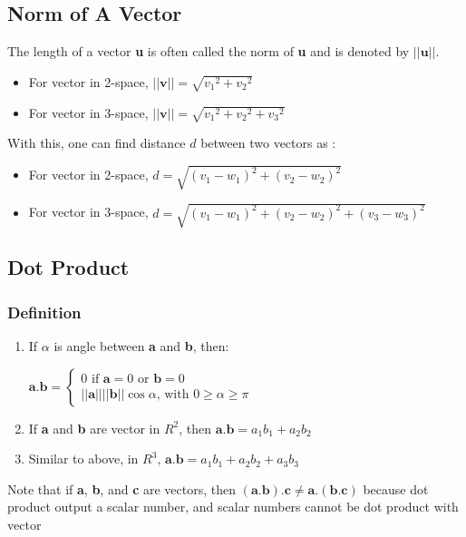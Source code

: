 \documentclass[a4paper,12pt]{article}
\begin{document}
\subsection*{Norm of A Vector}
The length of a vector \textbf{u} is often called the norm of \textbf{u} and is denoted by \(||\textbf{u}||\).
\begin{itemize}
  \item For vector in 2-space, \(||\textbf{v}||=\sqrt{{v_1}^2+{v_2}^2}\)
  \item For vector in 3-space, \(||\textbf{v}||=\sqrt{{v_1}^2+{v_2}^2+{v_3}^2}\)
\end{itemize}
With this, one can find distance \(d\) between two vectors as :
\begin{itemize}
  \item For vector in 2-space, \(d=\sqrt{(v_1-w_1)^2+(v_2-w_2)^2}\)
  \item For vector in 3-space, \(d=\sqrt{(v_1-w_1)^2+(v_2-w_2)^2+(v_3-w_3)^2}\)
\end{itemize}

\subsection*{Dot Product}
\subsubsection*{Definition}
\begin{enumerate}
  \item If \(\alpha\) is angle between \textbf{a} and \textbf{b}, then: \begin{center}
          \(\textbf{a}.\textbf{b}=\begin{cases}
            \text{0 if $\textbf{a} = 0$ or $\textbf{b} = 0$} \\
            \text{$||\textbf{a}||||\textbf{b}||\cos\alpha$, with $0\ge\alpha\ge\pi$}
          \end{cases} \)
        \end{center}
  \item If \textbf{a} and \textbf{b} are vector in \(R^2\), then \(\textbf{a}.\textbf{b}=a_1b_1+a_2b_2\)
  \item[] Similar to above, in \(R^3\), \(\textbf{a}.\textbf{b}=a_1b_1+a_2b_2+a_3b_3\)
\end{enumerate}
Note that if \textbf{a}, \textbf{b}, and \textbf{c} are vectors, then \((\textbf{a}.\textbf{b}).\textbf{c}\neq\textbf{a}.(\textbf{b}.\textbf{c})\) because dot product output a scalar number, and scalar numbers cannot be dot product with vector
\end{document}
